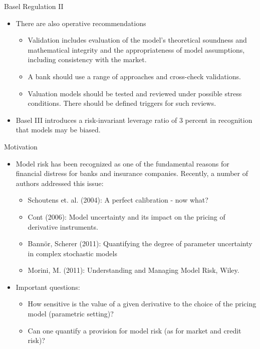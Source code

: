 {Basel Regulation II}
\begin{itemize}

\item<1-> There are also operative recommendations
\begin{itemize}
\item Validation includes evaluation of the model's theoretical soundness and mathematical integrity and the appropriateness of model assumptions, including consistency with the market.
\item A bank should use a range of approaches and cross-check validations.
\item Valuation models should be tested and reviewed under possible stress conditions. There should be defined triggers for such reviews.
\end{itemize}

\item<2->
Basel III introduces a risk-invariant leverage ratio of 3 percent in recognition that models may be biased.

\end{itemize}

{Motivation}
\begin{itemize}
\item<1-> Model risk has been recognized as one of the fundamental reasons for financial distress for banks and insurance companies.
Recently, a number of authors addressed this issue:
\begin{itemize}
\item Schoutens et. al. (2004): A perfect calibration - now what?
\item Cont (2006): Model uncertainty and its impact on the pricing of derivative instruments.
\item Bann{\"o}r, Scherer (2011): Quantifying the degree of parameter uncertainty in complex stochastic models
\item Morini, M. (2011): Understanding and Managing Model Risk, Wiley.
\end{itemize}
\item<2-> Important questions:
\begin{itemize}
\item How sensitive is the value of a given derivative to the choice of the pricing model (parametric setting)?
\item Can one quantify a provision for model risk (as for market and credit risk)?
\end{itemize}

\end{itemize}


